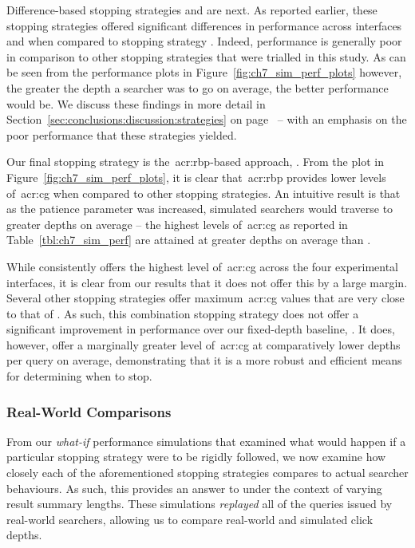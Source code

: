 Difference-based stopping strategies  and  are next. As reported earlier, these stopping strategies offered significant differences in performance across interfaces  and  when compared to stopping strategy . Indeed, performance is generally poor in comparison to other stopping strategies that were trialled in this study. As can be seen from the performance plots in Figure~\ref{fig:ch7_sim_perf_plots} however, the greater the depth a searcher was to go on average, the better performance would be. We discuss these findings in more detail in Section~\ref{sec:conclusions:discussion:strategies} on page~\pageref{sec:conclusions:discussion:strategies} -- with an emphasis on the poor performance that these strategies yielded.

Our final stopping strategy is the~\gls{acr:rbp}-based approach, . From the plot in Figure~\ref{fig:ch7_sim_perf_plots}, it is clear that~\gls{acr:rbp} provides lower levels of~\gls{acr:cg} when compared to other stopping strategies. An intuitive result is that as the patience parameter was increased, simulated searchers would traverse to greater depths on average -- the highest levels of~\gls{acr:cg} as reported in Table~\ref{tbl:ch7_sim_perf} are attained at greater depths on average than .

While  consistently offers the highest level of~\gls{acr:cg} across the four experimental interfaces, it is clear from our results that it does not offer this by a large margin. Several other stopping strategies offer maximum~\gls{acr:cg} values that are very close to that of . As such, this combination stopping strategy does not offer a significant improvement in performance over our fixed-depth baseline, . It does, however, offer a marginally greater level of~\gls{acr:cg} at comparatively lower depths per query on average, demonstrating that it is a more robust and efficient means for determining when to stop.

\subsubsection{Real-World Comparisons}\label{sec:snippets:simulations:results:comparisons}
From our \emph{what-if} performance simulations that examined what would happen if a particular stopping strategy were to be rigidly followed, we now examine how closely each of the aforementioned stopping strategies compares to actual searcher behaviours. As such, this provides an answer to  under the context of varying result summary lengths. These simulations \emph{replayed} all of the queries issued by real-world searchers, allowing us to compare real-world and simulated click depths.

